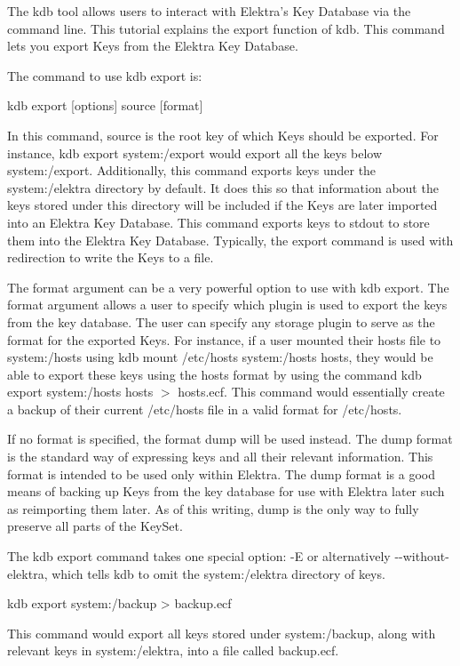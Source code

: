 The kdb tool allows users to interact with Elektra’s Key Database via the command line. This tutorial explains the export function of kdb. This command lets you export Keys from the Elektra Key Database.

The command to use kdb export is\+:


\begin{DoxyCode}
kdb export [options] source [format]
\end{DoxyCode}


In this command, source is the root key of which Keys should be exported. For instance, {\ttfamily kdb export system\+:/export} would export all the keys below {\ttfamily system\+:/export}. Additionally, this command exports keys under the {\ttfamily system\+:/elektra} directory by default. It does this so that information about the keys stored under this directory will be included if the Keys are later imported into an Elektra Key Database. This command exports keys to {\ttfamily stdout} to store them into the Elektra Key Database. Typically, the export command is used with redirection to write the Keys to a file.

The format argument can be a very powerful option to use with kdb export. The format argument allows a user to specify which plugin is used to export the keys from the key database. The user can specify any storage plugin to serve as the format for the exported Keys. For instance, if a user mounted their hosts file to {\ttfamily system\+:/hosts} using {\ttfamily kdb mount /etc/hosts system\+:/hosts hosts}, they would be able to export these keys using the hosts format by using the command {\ttfamily kdb export system\+:/hosts hosts $>$ hosts.\+ecf}. This command would essentially create a backup of their current {\ttfamily /etc/hosts} file in a valid format for {\ttfamily /etc/hosts}.

If no format is specified, the format {\ttfamily dump} will be used instead. The dump format is the standard way of expressing keys and all their relevant information. This format is intended to be used only within Elektra. The dump format is a good means of backing up Keys from the key database for use with Elektra later such as reimporting them later. As of this writing, {\ttfamily dump} is the only way to fully preserve all parts of the {\ttfamily Key\+Set}.

The kdb export command takes one special option\+: {\ttfamily -\/E} or alternatively {\ttfamily -\/-\/without-\/elektra}, which tells {\ttfamily kdb} to omit the {\ttfamily system\+:/elektra} directory of keys.


\begin{DoxyCode}
kdb export system:/backup > backup.ecf
\end{DoxyCode}


This command would export all keys stored under {\ttfamily system\+:/backup}, along with relevant keys in {\ttfamily system\+:/elektra}, into a file called {\ttfamily backup.\+ecf}. 